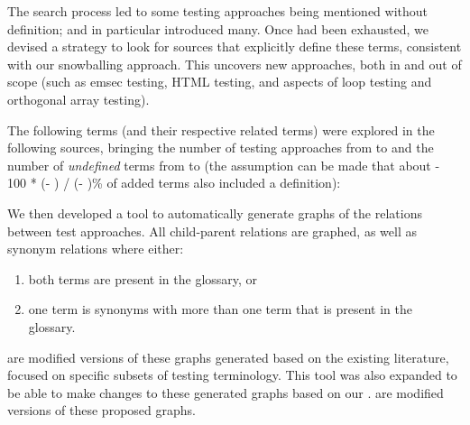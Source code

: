 The search process led to some testing approaches being
mentioned without definition;
\citep{IEEE2022} and \citep{Firesmith2015} in particular introduced many.
Once \stds{} had been exhausted, we devised a strategy to
look for sources that explicitly define these terms, consistent with
our snowballing approach. This uncovers new approaches, both in and out of
scope (such as \acf{emsec} testing, HTML testing, and aspects of loop testing and
orthogonal array testing).

The following terms (and their respective related terms) were explored%
\ifnotpaper in the following sources\fi, bringing the number of testing
approaches from \the\TotalBefore{} to \the\TotalAfter{} and the number of
\emph{undefined} terms from \the\UndefBefore{} to \the\UndefAfter{} (the
assumption can be made that about \the{} - 100 * (\UndefAfter -
\UndefBefore) / (\TotalAfter - \TotalBefore)\relax\% of added terms also
included a definition):



\ifnotpaper\else\ieeeTestTermsTable{}\fi

We then developed a tool to automatically generate graphs of the relations
between test approaches. All child-parent relations are graphed, as well as
synonym relations where either:
\begin{enumerate}
    \item both terms are present in the glossary, or
    \item one term is synonyms with more than one term that is present in the
          glossary.
\end{enumerate}
 are modified versions
of these graphs generated based on the existing literature, focused on specific
subsets of testing terminology. This tool was also expanded to be able to make
changes to these generated graphs based on our .
 are
modified versions of these proposed graphs.
